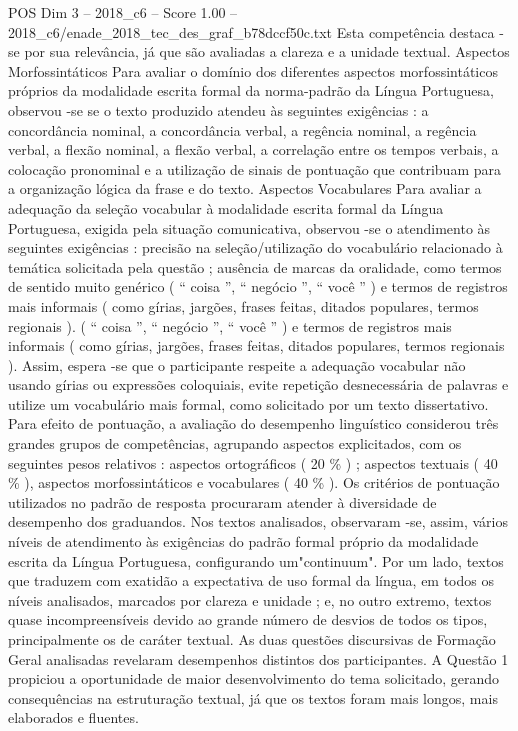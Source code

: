 \begin{textsample}{POS Dim 3 – 2018\_c6 – Score 1.00 – 2018\_c6/enade\_2018\_tec\_des\_graf\_b78dccf50c.txt}
Esta competência destaca -se por sua relevância, já que são avaliadas a clareza e a unidade textual.
Aspectos Morfossintáticos Para avaliar o domínio dos diferentes aspectos morfossintáticos próprios da modalidade escrita formal da norma-padrão da Língua Portuguesa, observou -se se o texto produzido atendeu às seguintes exigências : a concordância nominal, a concordância verbal, a regência nominal, a regência verbal, a flexão nominal, a flexão verbal, a correlação entre os tempos verbais, a colocação pronominal e a utilização de sinais de pontuação que contribuam para a organização lógica da frase e do texto.
Aspectos Vocabulares Para avaliar a adequação da seleção vocabular à modalidade escrita formal da Língua Portuguesa, exigida pela situação comunicativa, observou -se o atendimento às seguintes exigências : precisão na seleção/utilização do vocabulário relacionado à temática solicitada pela questão ; ausência de marcas da oralidade, como termos de sentido muito genérico ( “ coisa ”, “ negócio ”, “ você ” ) e termos de registros mais informais ( como gírias, jargões, frases feitas, ditados populares, termos regionais ). ( “ coisa ”, “ negócio ”, “ você ” ) e termos de registros mais informais ( como gírias, jargões, frases feitas, ditados populares, termos regionais ).
Assim, espera -se que o participante respeite a adequação vocabular não usando gírias ou expressões coloquiais, evite repetição desnecessária de palavras e utilize um vocabulário mais formal, como solicitado por um texto dissertativo.
Para efeito de pontuação, a avaliação do desempenho linguístico considerou três grandes grupos de competências, agrupando aspectos explicitados, com os seguintes pesos relativos : aspectos ortográficos ( 20 \% ) ; aspectos textuais ( 40 \% ), aspectos morfossintáticos e vocabulares ( 40 \% ).
Os critérios de pontuação utilizados no padrão de resposta procuraram atender à diversidade de desempenho dos graduandos.
Nos textos analisados, observaram -se, assim, vários níveis de atendimento às exigências do padrão formal próprio da modalidade escrita da Língua Portuguesa, configurando um"continuum".
Por um lado, textos que traduzem com exatidão a expectativa de uso formal da língua, em todos os níveis analisados, marcados por clareza e unidade ; e, no outro extremo, textos quase incompreensíveis devido ao grande número de desvios de todos os tipos, principalmente os de caráter textual.
As duas questões discursivas de Formação Geral analisadas revelaram desempenhos distintos dos participantes.
A Questão 1 propiciou a oportunidade de maior desenvolvimento do tema solicitado, gerando consequências na estruturação textual, já que os textos foram mais longos, mais elaborados e fluentes.

\end{textsample}
